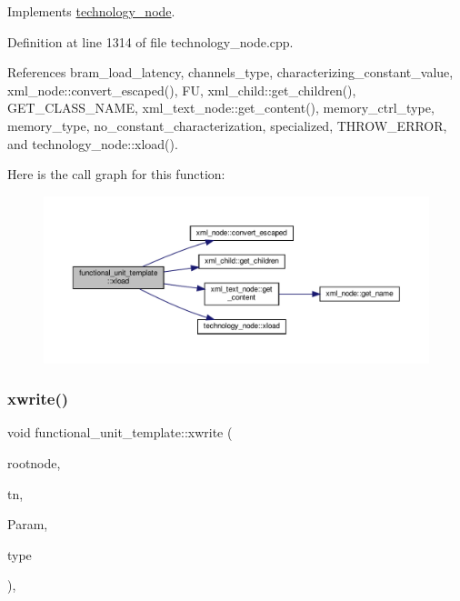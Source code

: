 Implements \hyperlink{structtechnology__node_aab3accd94480958219ca7771dd981a4f}{technology\+\_\+node}.



Definition at line 1314 of file technology\+\_\+node.\+cpp.



References bram\+\_\+load\+\_\+latency, channels\+\_\+type, characterizing\+\_\+constant\+\_\+value, xml\+\_\+node\+::convert\+\_\+escaped(), FU, xml\+\_\+child\+::get\+\_\+children(), G\+E\+T\+\_\+\+C\+L\+A\+S\+S\+\_\+\+N\+A\+ME, xml\+\_\+text\+\_\+node\+::get\+\_\+content(), memory\+\_\+ctrl\+\_\+type, memory\+\_\+type, no\+\_\+constant\+\_\+characterization, specialized, T\+H\+R\+O\+W\+\_\+\+E\+R\+R\+OR, and technology\+\_\+node\+::xload().

Here is the call graph for this function\+:
\nopagebreak
\begin{figure}[H]
\begin{center}
\leavevmode
\includegraphics[width=350pt]{d7/d24/structfunctional__unit__template_a648a971318b6dc24eda5156d718443d5_cgraph}
\end{center}
\end{figure}
\mbox{\label{structfunctional__unit__template_a3665d165eb3d912e2c46bf9e57006a40}} 
\subsubsection{\texorpdfstring{xwrite()}{xwrite()}}
{\footnotesize\ttfamily void functional\+\_\+unit\+\_\+template\+::xwrite (\begin{DoxyParamCaption}\item[{\hyperlink{classxml__element}{xml\+\_\+element} $\ast$}]{rootnode,  }\item[{const \hyperlink{technology__node_8hpp_a33dd193b7bd6b987bf0d8a770a819fa7}{technology\+\_\+node\+Ref}}]{tn,  }\item[{const \hyperlink{Parameter_8hpp_a37841774a6fcb479b597fdf8955eb4ea}{Parameter\+Const\+Ref}}]{Param,  }\item[{\hyperlink{target__device_8hpp_a476becc690220f0805ce73006449c732}{Target\+Device\+\_\+\+Type}}]{type }\end{DoxyParamCaption})\hspace{0.3cm}{\ttfamily [override]}, {\ttfamily [virtual]}}



